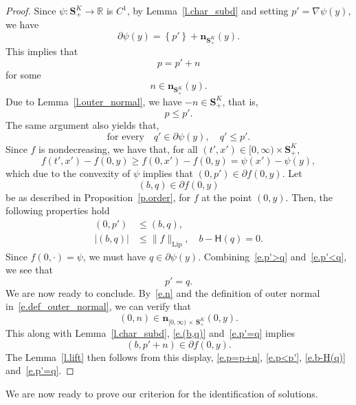 \documentclass[AHL,Unicode,longabstracts,published]{cedram}
\newcommand{\R}{\mathbb{R}}
\renewcommand{\S}{\mathbf{S}}
\newcommand{\bfn}{\mathbf{n}}
\newcommand{\Lip}{\mathrm{Lip}}
\renewcommand{\H}{\mathsf{H}}
\renewcommand{\leq}{\leqslant}
\renewcommand{\geq}{\geqslant}
\begin{document}
\begin{proof}
Since $\psi:\S^K_+\to \R$ is $C^1$, by Lemma~\ref{l.char_subd} and setting $p' = \nabla \psi(y)$, we have
\[
\partial \psi(y) = \left\{p'\right\} + \bfn_{\S^K_+}(y).
\]
This implies that
\begin{equation}\label{e.p=p+n}
p = p' + n
\end{equation}
for some
\begin{equation}\label{e.n}
n \in \bfn_{\S^K_+}(y).
\end{equation}
Due to Lemma~\ref{l.outer_normal}, we have $-n \in \S^K_+$, that is,
\begin{equation}\label{e.p<p'}
p\leq p'.
\end{equation}
The same argument also yields that,
\begin{equation}\label{e.p'>q}
\text{for every}\quad q' \in \partial \psi(y), \quad q' \leq p'.
\end{equation}
Since $f$ is nondecreasing, we have that, for all $(t',x')\in[0,\infty)\times \S^K_+$,
\[
f\left(t',x'\right) - f(0,y)\geq f\left(0,x'\right)-f(0,y) = \psi(x') - \psi(y),
\]
which due to the convexity of $\psi$ implies that $(0,p')\in \partial f(0,y)$. Let
\begin{equation}\label{e.(b,q)}
(b,q) \in \partial f(0,y)
\end{equation}
be as described in Proposition~\ref{p.order}, for $f$ at the point $(0,y)$. Then, the following properties hold
\begin{align}
\left(0,p'\right) &\leq (b, q),\label{e.p'<q}
\\
\left|(b,q)\right| &\leq \|f\|_{\Lip},\quad b - \H(q)=0. \label{e.b-H(q)}
\end{align}
Since $f(0,\cdot) = \psi$, we must have $q \in \partial \psi(y)$. Combining~\eqref{e.p'>q} and~\eqref{e.p'<q}, we see that
\begin{equation}\label{e.p'=q}
p' = q.
\end{equation}
We are now ready to conclude. By~\eqref{e.n} and the definition of outer normal in~\eqref{e.def_outer_normal}, we can verify that
\[
(0,n) \in \bfn_{[0,\infty)\,\times\,\S^K_+}(0,y).
\]
This along with Lemma~\ref{l.char_subd}, \eqref{e.(b,q)} and~\eqref{e.p'=q} implies
\[
\left(b,p' + n\right) \in \partial f(0,y).
\]
The Lemma~\ref{l.lift} then follows from this display, \eqref{e.p=p+n}, \eqref{e.p<p'}, \eqref{e.b-H(q)} and~\eqref{e.p'=q}.
\end{proof}

We are now ready to prove our criterion for the identification of solutions.
\end{document}
